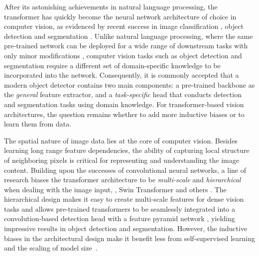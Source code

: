 
After its astonishing achievements in natural language processing, the transformer \cite{vaswani2017transformer} has quickly become the neural network architecture of choice in computer vision, as evidenced by recent success in image classification \cite{liu2021swintransformer,dosovitskiy2021vit}, object detection \cite{nicolas2020detr,zhu2021deformable,nguyen2022boxer} and segmentation \cite{wang2021maxdeeplab,zhang2021knet,cheng2022mask2former}. Unlike natural language processing, where the same pre-trained network can be deployed for a wide range of downstream tasks with only minor modifications \cite{brown2020gpt3,devlin2019bert}, computer vision tasks such as object detection and segmentation require a different set of domain-specific knowledge to be incorporated into the network. Consequently, it is commonly accepted that a modern object detector contains two main components: a pre-trained backbone as the \emph{general} feature extractor, and a \emph{task-specific} head that conducts detection and segmentation tasks using domain knowledge. For transformer-based vision architectures, the question remains whether to add more inductive biases or to learn them from data.

The spatial nature of image data lies at the core of computer vision. Besides learning long range feature dependencies, the ability of capturing local structure of neighboring pixels is critical for representing and understanding the image content. Building upon the successes of convolutional neural networks, a line of research biases the transformer architecture to be \emph{multi-scale} and \emph{hierarchical} when dealing with the image input, \ie, Swin Transformer \cite{liu2021swintransformer} and others \cite{fan2021mvit,wang2021pvit,heo2021rethinkingvit}.
The hierarchical design makes it easy to create multi-scale features for dense vision tasks and allows pre-trained transformers to be seamlessly integrated into a convolution-based detection head with a feature pyramid network \cite{tsung2017fpn}, yielding impressive results in object detection and segmentation. However, the inductive biases in the architectural design make it benefit less from self-supervised learning and the scaling of model size~\cite{li2022vitdet}.

